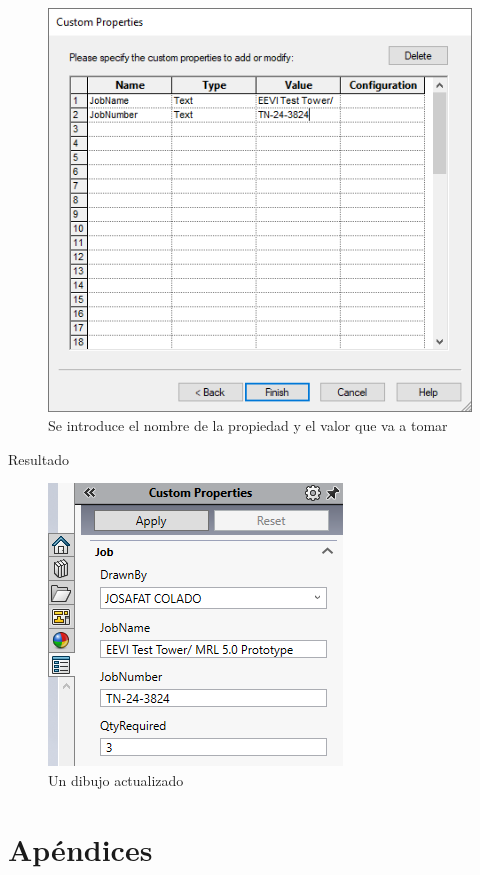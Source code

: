 \documentclass{report}
\begin{document}
\begin{figure}[H]
	\centering
	\includegraphics[width=0.65\linewidth, height=0.45\textheight,keepaspectratio]{Imagenes/solidworks_updatecustomprop03}
	\caption{Se introduce el nombre de la propiedad y el valor que va a tomar}
	\label{fig:solidworksupdatecustomprop03}
\end{figure}

\clearpage

{\LARGE Resultado}

\begin{figure}[H]
	\centering
	\includegraphics[width=0.55\linewidth, height=0.35\textheight,keepaspectratio]{Imagenes/solidworks_updatecustomprop04}
	\caption{Un dibujo actualizado}
	\label{fig:solidworksupdatecustomprop04}
\end{figure}

\part{Apéndices}

\appendix
\end{document}
